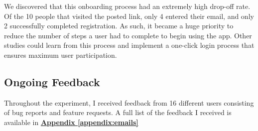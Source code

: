 \par We discovered that this onboarding process had an extremely high drop-off rate. Of the 10 people that visited the posted link, only 4 entered their email, and only 2 successfully completed registration. As such, it became a huge priority to reduce the number of steps a user had to complete to begin using the app. Other studies could learn from this process and implement a one-click login process that ensures maximum user participation.

\subsection{Ongoing Feedback}
\par Throughout the experiment, I received feedback from 16 different users consisting of bug reports and feature requests. A full list of the feedback I received is available in \textbf{\hyperref[appendix:emails]{Appendix \ref*{appendix:emails}}}

